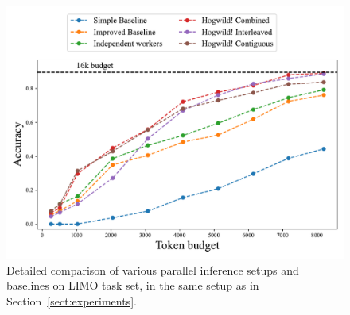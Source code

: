 \begin{figure}[h]
    \centering
    \includegraphics[width=\linewidth]{resources/method_comparison_limo.pdf}
    \caption{Detailed comparison of various parallel inference setups and baselines on LIMO task set, in the same setup as in Section~\ref{sect:experiments}.}
    \label{fig:limo_detailed_plot}
\end{figure}